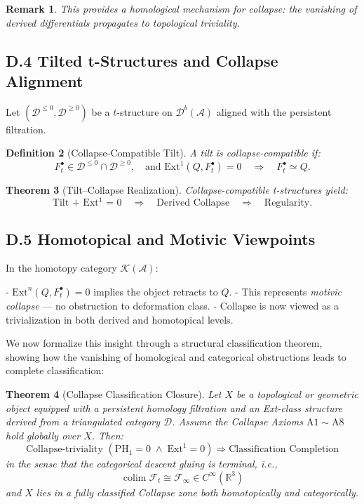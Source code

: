 \documentclass[11pt]{article}
\DeclareMathOperator{\colim}{colim}
\newtheorem{theorem}{Theorem}[section]
\newtheorem{definition}[theorem]{Definition}
\newtheorem{remark}[theorem]{Remark}
\begin{document}
\begin{remark}
This provides a homological mechanism for collapse: the vanishing of derived differentials propagates to topological triviality.
\end{remark}

\subsection*{D.4 Tilted t-Structures and Collapse Alignment}

Let $(\mathcal{D}^{\leq 0}, \mathcal{D}^{\geq 0})$ be a $t$-structure on $\mathcal{D}^b(\mathcal{A})$ aligned with the persistent filtration.

\begin{definition}[Collapse-Compatible Tilt]
A tilt is collapse-compatible if:
\[
F^\bullet_t \in \mathcal{D}^{\leq 0} \cap \mathcal{D}^{\geq 0},\quad \text{and } \mathrm{Ext}^1(Q, F^\bullet_t) = 0 \quad \Rightarrow \quad F^\bullet_t \simeq Q.
\]
\end{definition}

\begin{theorem}[Tilt–Collapse Realization]
Collapse-compatible t-structures yield:
\[
\text{Tilt + Ext$^1$ = 0} \quad \Rightarrow \quad \text{Derived Collapse} \quad \Rightarrow \quad \text{Regularity}.
\]
\end{theorem}

\subsection*{D.5 Homotopical and Motivic Viewpoints}

In the homotopy category \( \mathcal{K}(\mathcal{A}) \):

- \( \mathrm{Ext}^n(Q, F^\bullet_t) = 0 \) implies the object retracts to \( Q \).
- This represents \emph{motivic collapse} — no obstruction to deformation class.
- Collapse is now viewed as a trivialization in both derived and homotopical levels.

\bigskip

We now formalize this insight through a structural classification theorem, showing how the vanishing of homological and categorical obstructions leads to complete classification:

\begin{theorem}[Collapse Classification Closure]
Let \( X \) be a topological or geometric object equipped with a persistent homology filtration and an Ext-class structure derived from a triangulated category \( \mathcal{D} \).  
Assume the Collapse Axioms \( \mathrm{A}1 \sim \mathrm{A}8 \) hold globally over \( X \).  
Then:
\[
\text{Collapse-triviality } \left(\mathrm{PH}_1 = 0 \;\wedge\; \mathrm{Ext}^1 = 0 \right) \Rightarrow \text{Classification Completion}
\]
in the sense that the categorical descent gluing is terminal, i.e.,
\[
\colim \mathcal{F}_t \cong \mathcal{F}_\infty \in C^\infty(\mathbb{R}^3)
\]
and \( X \) lies in a fully classified Collapse zone both homotopically and categorically.
\end{theorem}
\end{document}
